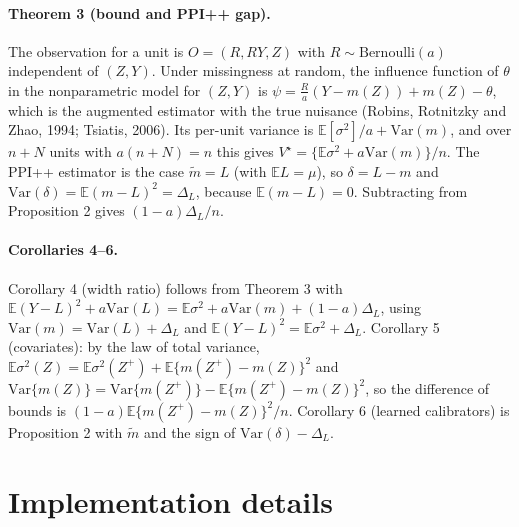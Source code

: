 \paragraph{Theorem 3 (bound and PPI++ gap).}
The observation for a unit is $O=(R,RY,Z)$ with $R\sim\mathrm{Bernoulli}(a)$ independent of $(Z,Y)$. Under missingness at random, the influence function of $\theta$ in the nonparametric model for $(Z,Y)$ is $\psi=\frac{R}{a}(Y-m(Z))+m(Z)-\theta$, which is the augmented estimator with the true nuisance (Robins, Rotnitzky and Zhao, 1994; Tsiatis, 2006). Its per-unit variance is $\mathbb E[\sigma^2]/a+\mathrm{Var}(m)$, and over $n+N$ units with $a(n+N)=n$ this gives $V^\star=\{\mathbb E\sigma^2+a\mathrm{Var}(m)\}/n$. The PPI++ estimator is the case $\tilde m=L$ (with $\mathbb E L=\mu$), so $\delta=L-m$ and $\mathrm{Var}(\delta)=\mathbb E(m-L)^2=\Delta_L$, because $\mathbb E(m-L)=0$. Subtracting from Proposition 2 gives $(1-a)\Delta_L/n$.

\paragraph{Corollaries 4–6.}
Corollary 4 (width ratio) follows from Theorem 3 with $\mathbb E(Y-L)^2+a\mathrm{Var}(L)=\mathbb E\sigma^2+a\mathrm{Var}(m)+(1-a)\Delta_L$, using $\mathrm{Var}(m)=\mathrm{Var}(L)+\Delta_L$ and $\mathbb E(Y-L)^2=\mathbb E\sigma^2+\Delta_L$. Corollary 5 (covariates): by the law of total variance, $\mathbb E\sigma^2(Z)=\mathbb E\sigma^2(Z^+)+\mathbb E\{m(Z^+)-m(Z)\}^2$ and $\mathrm{Var}\{m(Z)\}=\mathrm{Var}\{m(Z^+)\}-\mathbb E\{m(Z^+)-m(Z)\}^2$, so the difference of bounds is $(1-a)\mathbb E\{m(Z^+)-m(Z)\}^2/n$. Corollary 6 (learned calibrators) is Proposition 2 with $\tilde m$ and the sign of $\mathrm{Var}(\delta)-\Delta_L$.

\section{Implementation details}
\label{app:impl}


